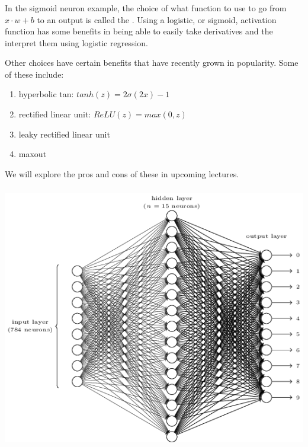 \documentclass[xetex,mathserif,serif,aspectratio=169]{beamer}
\begin{document}
\begin{frame}[fragile] \frametitle{} \oldB \small


In the sigmoid neuron example, the choice of what function to use
to go from $x \cdot w + b$ to an output is called the . Using a logistic, or sigmoid, activation function has
some benefits in being able to easily take derivatives and the interpret
them using logistic regression.

Other choices have certain benefits that have recently grown in popularity.
Some of these include:
\begin{enumerate}
\item hyperbolic tan: $tanh(z) = 2 \sigma(2x) - 1$
\item rectified linear unit: $ReLU(z) = max(0, z)$
\item leaky rectified linear unit
\item maxout
\end{enumerate}
We will explore the pros and cons of these in upcoming lectures.

\end{frame}


\begin{frame}[fragile] \frametitle{} \oldB \small


\begin{center}
\includegraphics[height=0.8\textheight]{img/tikz12.png}
\end{center}

\end{frame}
\end{document}
